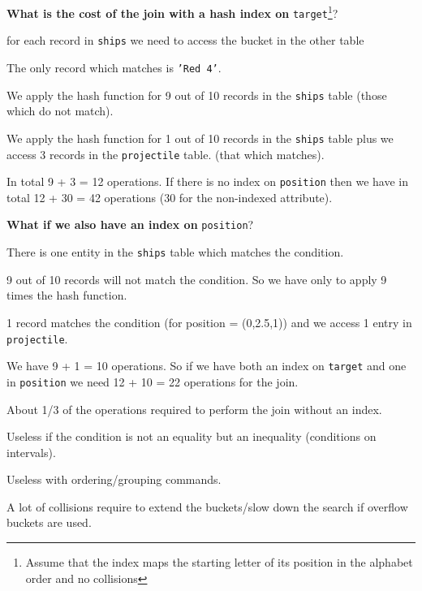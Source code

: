 \documentclass{beamer}
\begin{document}
\begin{slide}{
\item \textbf{What is the cost of the join with a hash index on} \texttt{target}\footnote{Assume that the index maps the starting letter of its position in the alphabet order and no collisions}?
\pause
\item for each record in \texttt{ships} we need to access the bucket in the other table
\item The only record which matches is \texttt{'Red 4'}.
\item We apply the hash function for 9 out of 10 records in the \texttt{ships} table (those which do not match).
}\end{slide}

\begin{slide}{
\item We apply the hash function for 1 out of 10 records in the \texttt{ships} table plus we access 3 records in the \texttt{projectile} table. (that which matches).
\item In total 9 + 3 = 12 operations. If there is no index on \texttt{position} then we have in total 12 + 30 = 42 operations (30 for the non-indexed attribute).
}\end{slide}

\begin{slide}{
\item \textbf{What if we also have an index on} \texttt{position}?
\pause
\item There is one entity in the \texttt{ships} table which matches the condition.
\item 9 out of 10 records will not match the condition. So we have only to apply 9 times the hash function.
\item 1 record matches the condition (for position = (0,2.5,1)) and we access 1 entry in \texttt{projectile}.
\item We have 9 + 1 = 10 operations. So if we have both an index on \texttt{target} and one in \texttt{position} we need 12 + 10 = 22 operations for the join.
\item About 1/3 of the operations required to perform the join without an index.
}\end{slide}

\begin{slide}{
\item Useless if the condition is not an equality but an inequality (conditions on intervals).
\item Useless with ordering/grouping commands.
\item A lot of collisions require to extend the buckets/slow down the search if overflow buckets are used.
}\end{slide}
\end{document}
